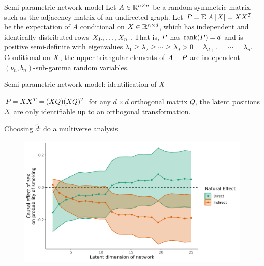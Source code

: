 \documentclass{beamer}
\theoremstyle{remark}
\begin{document}
\begin{frame}{Semi-parametric network model}
    Let $A \in \mathbb{R}^{n \times n}$ be a random symmetric matrix, such as the adjacency matrix of an undirected graph. Let $\Apop = \E[\X]{A} = \X \X^T$ be the expectation of $A$ conditional on $X \in \mathbb{R}^{n \times d}$, which has independent and identically distributed rows $X_{1 \cdot}, \dots, X_{n \cdot}$. That is, $P$ has $\rank \paren*{\Apop} = d$ and is positive semi-definite with eigenvalues $\lambda_1 \ge \lambda_2 \ge \cdots \ge \lambda_d > 0 = \lambda_{d+1} = \cdots = \lambda_n$. Conditional on $X$, the upper-triangular elements of $A - P$ are independent $(\nu_n, b_n)$-sub-gamma random variables.
\end{frame}


\begin{frame}{Semi-parametric network model: identification of $X$}

    $P = X X^T = (X Q) (X Q)^T$ for any $d \times d$ orthogonal matrix $Q$, the latent positions $X$ are only identifiable up to an orthogonal transformation.
\end{frame}

\begin{frame}{Choosing $\widehat{d}$: do a multiverse analysis}

    \centering

    \begin{figure}
        \includegraphics[width=\textwidth]{figures/glasgow-effects.png}
    \end{figure}

\end{frame}
\end{document}
